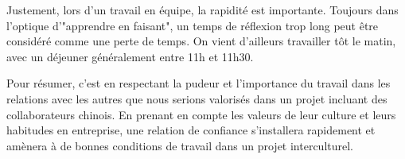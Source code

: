 \documentclass{article}
\begin{document}
Justement, lors d'un travail en équipe, la rapidité est importante. Toujours dans l'optique d'"apprendre en faisant", un temps de réflexion trop long peut être considéré comme une perte de temps. On vient d'ailleurs travailler tôt le matin, avec un déjeuner généralement entre 11h et 11h30.\newpage

Pour résumer, c'est en respectant la pudeur et l'importance du travail dans les relations avec les autres que nous serions valorisés dans un projet incluant des collaborateurs chinois. En prenant en compte les valeurs de leur culture et leurs habitudes en entreprise, une relation de confiance s'installera rapidement et amènera à de bonnes conditions de travail dans un projet interculturel. \\
\end{document}
